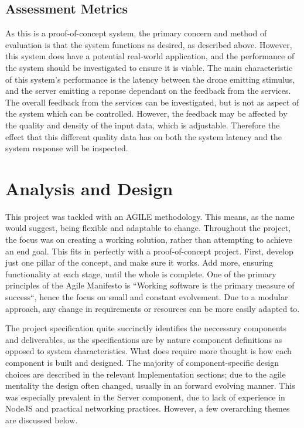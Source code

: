 \documentclass{article}
\begin{document}
\subsection{Assessment Metrics}
As this is a proof-of-concept system, the primary concern and method of evaluation is that the system functions as desired, as described above. However, this system does have a potential real-world application, and the performance of the system should be investigated to ensure it is viable. The main characteristic of this system's performance is the latency between the drone emitting stimulus, and the server emitting a reponse dependant on the feedback from the services. The overall feedback from the services can be investigated, but is not as aspect of the system which can be controlled. However, the feedback may be affected by the quality and density of the input data, which is adjustable. Therefore the effect that this different quality data has on both the system latency and the system response will be inspected.

\section{Analysis and Design}
This project was tackled with an AGILE methodology\cite{agileManifest}. This means, as the name would suggest, being flexible and adaptable to change. Throughout the project, the focus was on creating a working solution, rather than attempting to achieve an end goal. This fits in perfectly with a proof-of-concept project. First, develop just one pillar of the concept, and make sure it works. Add more, ensuring functionality at each stage, until the whole is complete. One of the primary principles of the Agile Manifesto is ``Working software is the primary measure of success``\cite{agileManifest}, hence the focus on small and constant evolvement. Due to a modular approach, any change in requirements or resources can be more easily adapted to. 

The project specification quite succinctly identifies the neccessary components and deliverables, as the specifications are by nature component definitions as opposed to system characteristics. What does require more thought is how each component is built and designed. The majority of component-specific design choices are described in the relevant Implementation sections; due to the agile mentality the design often changed, usually in an forward evolving manner. This was especially prevalent in the Server component, due to lack of experience in NodeJS and practical networking practices. However, a few overarching themes are discussed below.
\end{document}

